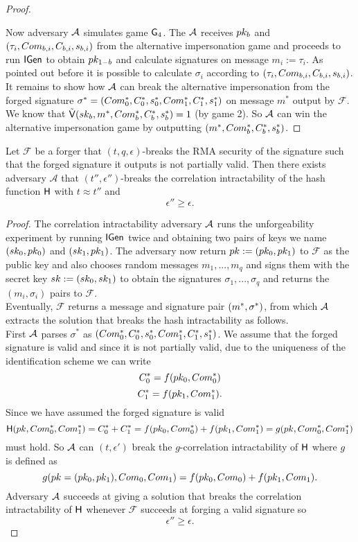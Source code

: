 \begin{proof}
\begin{description}[wide,itemindent=\labelsep]
\end{description}

Now adversary $\mathcal{A}$ simulates game $\mathsf{G}_4$. The $\mathcal{A}$ receives $pk_{b}$ and $(\tau_i, Com_{b,i},C_{b,i},s_{b,i})$ from the alternative impersonation game and proceeds to
run $\mathsf{IGen}$ to obtain $pk_{1-b}$ and
 calculate signatures on message $m_i := \tau_i$. As pointed out before it is possible to calculate $\sigma_i$ according to $(\tau_i, Com_{b,i},C_{b,i},s_{b,i})$.
\\
It remains to show how $\mathcal{A}$ can break the alternative impersonation from the forged signature
$\sigma^* = (Com^*_{0},C^*_{0},s^*_{0}, Com^*_{1}, C^*_{1},s^*_{1})$ on message $m^*$ output by $\mathcal{F}$. We know that $\tilde{\mathsf{V}}(sk_b,m^*,Com^*_b,C^*_b,s^*_b) =1$ (by game 2).  So $\mathcal{A}$ can win the alternative impersonation game by outputting $(m^*,Com^*_b,C^*_b,s^*_b)$.
\end{proof}

\begin{lemma}
Let $\mathcal{F}$ be a forger that $(t,q,\epsilon)$-breaks the RMA security of the signature such that the forged signature it outputs is not partially valid. Then there exists adversary $\mathcal{A}$ that $(t'',\epsilon'')$-breaks the correlation intractability of the hash function $\mathsf{H}$ with 
$t \approx t''$ and 
$$\epsilon'' \geq \epsilon.$$
\end{lemma}

\begin{proof}
The correlation intractability adversary $\mathcal{A}$ runs the unforgeability experiment by
running $\mathsf{IGen}$ twice and obtaining two pairs of keys we name $(sk_0,pk_0)$ and $(sk_1, pk_1)$. The adversary now return 
$pk := (pk_0, pk_1)$ to $\mathcal{F}$ as the public key and also
chooses random messages $m_1,...,m_q$ and signs them with the secret key 
$sk := (sk_0, sk_1)$ to obtain the signatures $\sigma_1,...,\sigma_q$ and returns the $(m_i,\sigma_i)$ pairs to $\mathcal{F}$.
\\
Eventually, $\mathcal{F}$ returns a message and signature pair 
 $(m^*, \sigma^*)$, from which $\mathcal{A}$ extracts the solution that breaks the hash intractability as follows.
 \\
 First $\mathcal{A}$ parses $\sigma^*$
as
$(Com^*_{0},C^*_{0},s^*_{0}, Com^*_{1}, C^*_{1},s^*_{1})$.
We assume that the forged signature is valid and since it is not partially valid, due to the uniqueness of the identification scheme
 we can write
$$C^*_0 = f(pk_0,Com^*_0)$$
$$C^*_1 = f(pk_1,Com^*_1).$$
Since we have assumed the forged signature is valid 
$$\mathsf{H}(pk,Com^*_0,Com^*_1)=C^*_0+C^*_1 =  f(pk_0,Com^*_0)+ f(pk_1,Com^*_1) = g(pk,Com^*_0,Com^*_1)$$
must hold.
So $\mathcal{A}$ can $(t,\epsilon')$ break the $g$-correlation intractability of $\mathsf{H}$ where $g$ is defined as 
$$g(pk=(pk_0,pk_1), Com_0, Com_1) =  f(pk_0,Com_0)+ f(pk_1,Com_1).$$
Adversary $\mathcal{A}$ succeeds at giving a solution that breaks the correlation intractability of $\mathsf{H}$ whenever $\mathcal{F}$ succeeds at forging a valid signature so
$$\epsilon''\geq\epsilon.$$

\end{proof}



